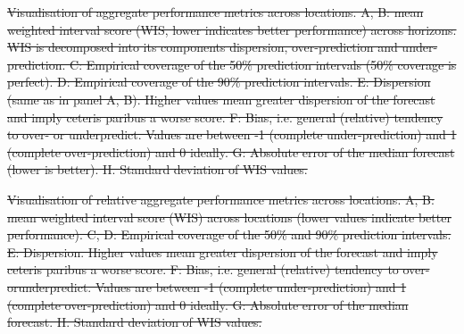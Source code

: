 \documentclass[10pt,letterpaper]{article}
\providecommand{\DIFdeltex}[1]{{\protect\color{red}\sout{#1}}}                      %
\providecommand{\DIFdelFL}[1]{\DIFdel{#1}} %
\providecommand{\DIFdel}[1]{\texorpdfstring{\DIFdeltex{#1}}{}} %
\begin{document}

{%
\DIFdelFL{Visualisation of aggregate performance metrics across locations. A, B: mean weighted interval score (WIS, lower indicates better performance) across horizons. WIS is decomposed into its components dispersion, over-prediction and under-prediction. C: Empirical coverage of the 50\% prediction intervals (50\% coverage is perfect). D: Empirical coverage of the 90\% prediction intervals. E: Dispersion (same as in panel A, B). Higher values mean greater dispersion of the forecast and imply ceteris paribus a worse score. F: Bias, i.e. general (relative) tendency to over- or underpredict. Values are between -1 (complete under-prediction) and 1 (complete over-prediction) and 0 ideally. G: Absolute error of the median forecast (lower is better). H. Standard deviation of WIS values.}}%


{%
\DIFdelFL{Visualisation of relative aggregate performance metrics across locations. A, B: mean weighted interval score (WIS) across locations (lower values indicate better performance). C, D: Empirical coverage of the 50\% and 90\% prediction intervals. E: Dispersion. Higher values mean greater dispersion of the forecast and imply ceteris paribus a worse score. F: Bias, i.e. general (relative) tendency to over- orunderpredict. Values are between -1 (complete under-prediction) and 1 (complete over-prediction) and 0 ideally. G: Absolute error of the median forecast. H. Standard deviation of WIS values.}}%
\end{document}

